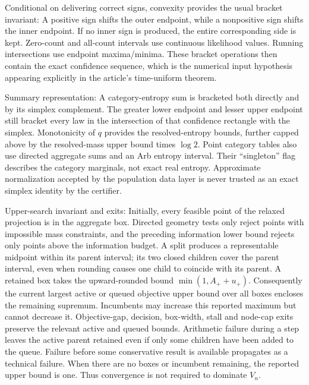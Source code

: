 Conditional on delivering correct signs, convexity provides the usual bracket invariant: A positive sign shifts the outer endpoint, while a nonpositive sign shifts the inner endpoint. If no inner sign is produced, the entire corresponding side is kept. Zero-count and all-count intervals use continuous likelihood values. Running intersections use endpoint maxima/minima. These bracket operations then contain the exact confidence sequence, which is the numerical input hypothesis appearing explicitly in the article's time-uniform theorem.

Summary representation: A category-entropy sum is bracketed both directly and by its simplex complement. The greater lower endpoint and lesser upper endpoint still bracket every law in the intersection of that confidence rectangle with the simplex. Monotonicity of $q$ provides the resolved-entropy bounds, further capped above by the resolved-mass upper bound times $\log2$. Point category tables also use directed aggregate sums and an Arb entropy interval. Their ``singleton'' flag describes the category marginals, not exact real entropy. Approximate normalization accepted by the population data layer is never trusted as an exact simplex identity by the certifier.

Upper-search invariant and exits: Initially, every feasible point of the relaxed projection is in the aggregate box. Directed geometry tests only reject points with impossible mass constraints, and the preceding information lower bound rejects only points above the information budget. A split produces a representable midpoint within its parent interval; its two closed children cover the parent interval, even when rounding causes one child to coincide with its parent. A retained box takes the upward-rounded bound $\min(1,A_++u_+)$. Consequently the current largest active or queued objective upper bound over all boxes encloses the remaining supremum. Incumbents may increase this reported maximum but cannot decrease it. Objective-gap, decision, box-width, stall and node-cap exits preserve the relevant active and queued bounds. Arithmetic failure during a step leaves the active parent retained even if only some children have been added to the queue. Failure before some conservative result is available propagates as a technical failure. When there are no boxes or incumbent remaining, the reported upper bound is one. Thus convergence is not required to dominate $V_n$.

